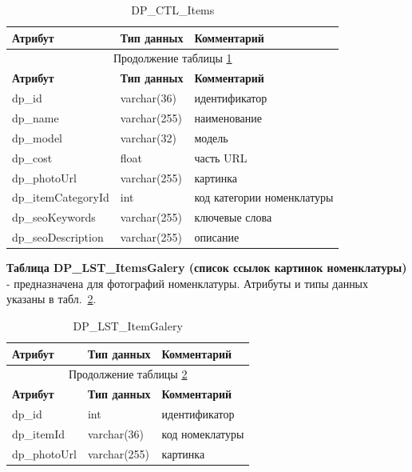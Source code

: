 \begin{longtable}{|p{5.5cm}|p{3.5cm}|p{7.5cm}|}
    \caption{DP\_CTL\_Items} \label{tab:DP_CTL_Items} \\
    \hline
    \textbf{Атрибут} & \textbf{Тип данных} & \textbf{Комментарий} \\ \hline
    \endfirsthead

    \multicolumn{3}{c}{Продолжение таблицы \ref{tab:DP_CTL_Items}} \\
    \hline
    \textbf{Атрибут} & \textbf{Тип данных} & \textbf{Комментарий} \\ \hline
    \endhead

    \endfoot

    \endlastfoot
    dp\_id & varchar(36) & идентификатор \\ \hline
    dp\_name & varchar(255) & наименование \\ \hline
    dp\_model & varchar(32) & модель \\ \hline
    dp\_cost & float & часть URL \\ \hline
    dp\_photoUrl & varchar(255) & картинка\\ \hline
    dp\_itemCategoryId & int & код категории номенклатуры \\ \hline
    dp\_seoKeywords & varchar(255) & ключевые слова \\ \hline
    dp\_seoDescription & varchar(255) & описание \\ \hline
\end{longtable}

\textbf{Таблица DP\_LST\_ItemsGalery (список ссылок картинок номенклатуры)} - предназначена для фотографий номенклатуры.
Атрибуты и типы данных указаны в табл.~\ref{tab:DP_LST_ItemGalery}.

\begin{longtable}{|p{5.5cm}|p{3.5cm}|p{7.5cm}|}
    \caption{DP\_LST\_ItemGalery} \label{tab:DP_LST_ItemGalery} \\
    \hline
    \textbf{Атрибут} & \textbf{Тип данных} & \textbf{Комментарий} \\ \hline
    \endfirsthead

    \multicolumn{3}{c}{Продолжение таблицы \ref{tab:DP_LST_ItemGalery}} \\
    \hline
    \textbf{Атрибут} & \textbf{Тип данных} & \textbf{Комментарий} \\ \hline
    \endhead

    \endfoot

    \endlastfoot
    dp\_id & int & идентификатор \\ \hline
    dp\_itemId & varchar(36) & код номеклатуры \\ \hline
    dp\_photoUrl & varchar(255) & картинка \\ \hline
\end{longtable}

